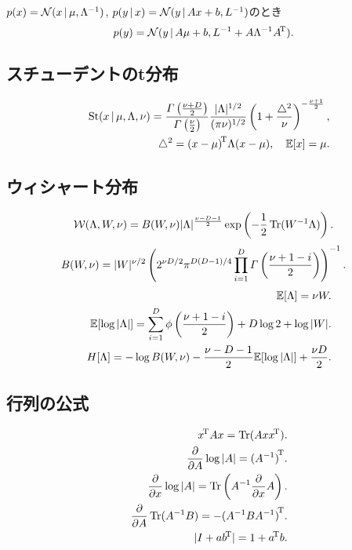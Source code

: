 $p(x)={\cal N}(x\,|\,\mu,\Lambda^{-1})$, $p(y\,|\,x)={\cal N}(y\,|\,Ax+b, L^{-1})$のとき
$$
p(y)={\cal N}(y\,|\,A\mu + b, L^{-1} + A\Lambda^{-1}{A}^{\!\mathrm{T}}).
$$
\vspace{0pt}

\subsection{スチューデントのt分布}
\begin{eqnarray*}
&&
\mathop{\mathrm{St}}\nolimits(x\,|\,\mu,\Lambda,\nu)
=\frac{\varGamma\left(\frac{\nu+D}{2}\right)}{\varGamma\left(\frac{\nu}{2}\right)}
\frac{|\Lambda|^{1/2}}{(\pi \nu)^{1/2}}\left(1+\frac{\triangle^2}{\nu}\right)^{-\frac{\nu+1}{2}},
\\&& \triangle^2={(x-\mu)}^{\!\mathrm{T}} \Lambda {(x-\mu)},
\quad \mathbb{E}[x]=\mu.
\end{eqnarray*}
\vspace{0pt}

\subsection{ウィシャート分布}
$$
{\cal W}(\Lambda,W,\nu)=B(W,\nu)|\Lambda|^{\frac{\nu-D-1}{2}}\exp\left(-\frac{1}{2}\mathop{\mathrm{Tr}}\nolimits (W^{-1}\Lambda)\right).
$$
$$
B(W, \nu)=|W|^{\nu/2}\left(2^{\nu D/2} \pi ^{D(D-1)/4} \prod_{i=1}^D \varGamma\left(\frac{\nu+1-i}{2}\right)\right)^{-1}.
$$
\begin{eqnarray*}
&& \mathbb{E}[\Lambda]=\nu W.\\
&& \mathbb{E}[\log|\Lambda|]=\sum_{i=1}^D \phi\left(\frac{\nu+1-i}{2}\right)+D \log 2 + \log |W|.\\
&& H[\Lambda]=-\log B(W,\nu)-\frac{\nu-D-1}{2}\mathbb{E}[\log |\Lambda|]+\frac{\nu D}{2}.
\end{eqnarray*}
\vspace{0pt}

\subsection{行列の公式}
\begin{eqnarray*}
&& {x}^{\!\mathrm{T}} A {x}=\mathop{\mathrm{Tr}}\nolimits(Ax{x}^{\!\mathrm{T}}).\\
&& \frac{\partial}{\partial A}\log|A|={(A^{-1})}^{\!\mathrm{T}}.\\
&& \frac{\partial}{\partial x}\log|A|=\mathop{\mathrm{Tr}}\nolimits\left(A^{-1}\frac{\partial}{\partial x}A\right).\\
&& \frac{\partial}{\partial A}\mathop{\mathrm{Tr}}\nolimits(A^{-1}B) = -{(A^{-1}BA^{-1})}^{\!\mathrm{T}}.\\
&& |I+a{b}^{\!\mathrm{T}}|=1+{a}^{\!\mathrm{T}}b.
\end{eqnarray*}
\vspace{0pt}

